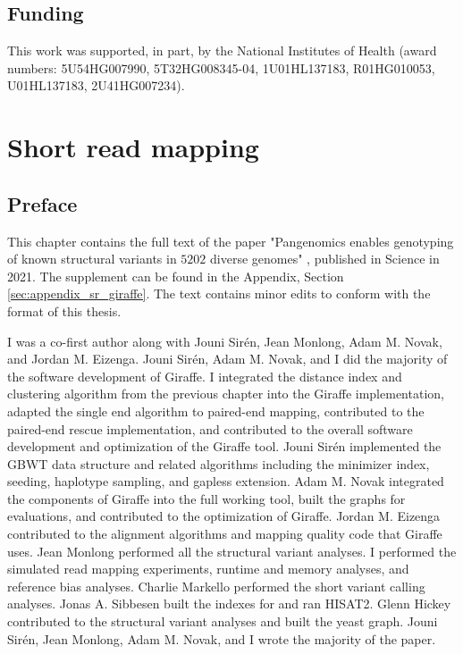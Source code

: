 \documentclass[11pt]{ucscthesis}
\begin{document}
\section{Funding}
This work was supported, in part, by the National Institutes of Health (award numbers: 5U54HG007990, 5T32HG008345-04, 1U01HL137183, R01HG010053, U01HL137183, 2U41HG007234).

\chapter{Short read mapping}
\label{chapter:sr-giraffe}
\section{Preface}
This chapter contains the full text of the paper "Pangenomics enables genotyping of known structural variants in $5202$ diverse genomes" \cite{sr_giraffe_2021}, published in Science in 2021.
The supplement can be found in the Appendix, Section \ref{sec:appendix_sr_giraffe}.
The text contains minor edits to conform with the format of this thesis.

I was a co-first author along with Jouni Sirén, Jean Monlong, Adam M. Novak, and Jordan M. Eizenga.
Jouni Sirén, Adam M. Novak, and I did the majority of the software development of Giraffe.
I integrated the distance index and clustering algorithm from the previous chapter into the Giraffe implementation, adapted the single end algorithm to paired-end mapping, contributed to the paired-end rescue implementation, and contributed to the overall software development and optimization of the Giraffe tool.
Jouni Sirén implemented the GBWT data structure and related algorithms including the minimizer index, seeding, haplotype sampling, and gapless extension.
Adam M. Novak integrated the components of Giraffe into the full working tool, built the graphs for evaluations, and contributed to the optimization of Giraffe.
Jordan M. Eizenga contributed to the alignment algorithms and mapping quality code that Giraffe uses.
Jean Monlong performed all the structural variant analyses.
I performed the simulated read mapping experiments, runtime and memory analyses, and reference bias analyses. 
Charlie Markello performed the short variant calling analyses.
Jonas A. Sibbesen built the indexes for and ran HISAT2.
Glenn Hickey contributed to the structural variant analyses and built the yeast graph.
Jouni Sirén, Jean Monlong, Adam M. Novak, and I wrote the majority of the paper. 

\newpage
\end{document}
